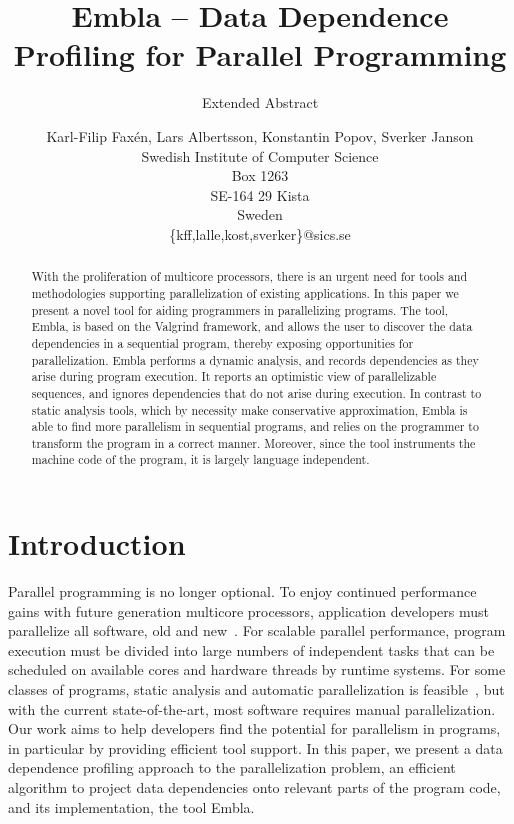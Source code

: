 \documentclass{acm_proc_article-sp}
\begin{document}
\title{Embla -- Data Dependence Profiling for Parallel Programming }
\subtitle{Extended Abstract}
\author{Karl-Filip Fax\'en, Lars Albertsson, Konstantin Popov, Sverker Janson\\
       Swedish Institute of Computer Science\\
       Box 1263\\
       SE-164 29 Kista\\
       Sweden\\
       \{kff,lalle,kost,sverker\}@sics.se}
\date{}
\maketitle

\begin{abstract}

With the proliferation of multicore processors, there is an urgent need for
tools and methodologies supporting parallelization of existing
applications.  In this paper we present a novel tool for aiding
programmers in parallelizing programs. The tool, Embla, is based on the
Valgrind framework, and allows the user to
discover the data dependencies in a sequential program, thereby exposing
opportunities for parallelization.  Embla performs a dynamic analysis,
and records dependencies as they
arise during program execution.  It reports an optimistic view of
parallelizable sequences, and ignores dependencies that do not arise during
execution.  In contrast to static analysis tools,
which by necessity make conservative approximation, Embla is able to find
more parallelism in sequential programs, and relies on the programmer to
transform the program in a correct manner. 
Moreover, since the tool instruments the machine code of the program,
it is largely language independent. 

\end{abstract}


\section{Introduction}

Parallel programming is no longer optional.  To enjoy continued
performance gains with future generation multicore processors,
application developers must parallelize all software, old and
new~\cite{TEL95,ONHWC96,KAB03,VIAVAC05}.  For scalable parallel
performance, program execution must be divided into large numbers of
independent tasks that can be scheduled on available cores and hardware
threads by runtime systems.  For some classes of programs, static
analysis and automatic parallelization is feasible~\cite{KA02}, but with
the current state-of-the-art, most software requires manual
parallelization.  Our work aims to help developers find the potential
for parallelism in programs, in particular by providing efficient tool
support.  In this paper, we present a data dependence profiling approach
to the parallelization problem, an efficient algorithm to project data
dependencies onto relevant parts of the program code, and its
implementation, the tool Embla.
\end{document}
